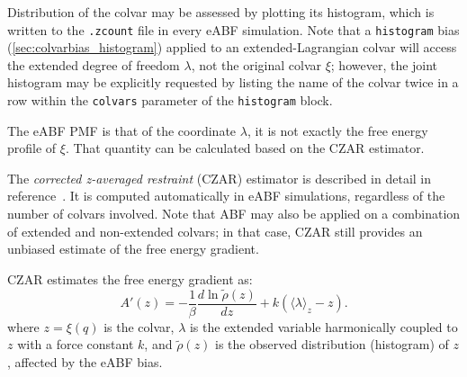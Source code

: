 Distribution of the colvar may be assessed by plotting its histogram, which
is written to the \outputName\texttt{.zcount} file in every eABF simulation.
Note that a \texttt{histogram} bias (\ref{sec:colvarbias_histogram})
applied to an extended-Lagrangian colvar
will access the extended degree of freedom $\lambda$, not the original colvar $\xi$;
however, the joint histogram may be explicitly requested by listing the name of the
colvar twice in a row within the \texttt{colvars} parameter of the \texttt{histogram} block.

The eABF PMF is that of the coordinate $\lambda$, it is not exactly the free energy profile of $\xi$.
That quantity can be calculated based on  the CZAR
estimator.



The \emph{corrected z-averaged restraint} (CZAR) estimator
is described in detail in reference~\cite{Lesage2017}.
It is computed automatically in eABF simulations,
regardless of the number of colvars involved.
Note that ABF may also be applied on a combination of extended and non-extended
colvars; in that case, CZAR still provides an unbiased estimate of the free energy gradient.

CZAR estimates the free energy gradient as:
\begin{equation}
A'(z) = - \frac{1}{\beta} \frac{d\ln  \tilde \rho (z)}{dz}  + k (\langle\lambda\rangle_z - z).
\label{eq:czar}
\end{equation}
where $z=\xi(q)$ is the colvar, $\lambda$ is the extended variable harmonically
coupled to $z$ with a force constant $k$, and $\tilde\rho (z)$ is the observed
distribution (histogram) of $z$, affected by the eABF bias.

